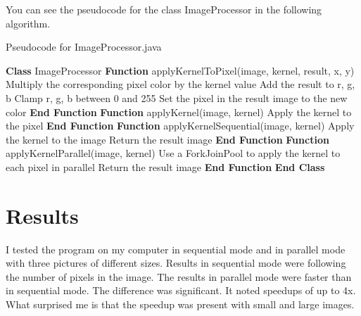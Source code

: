 \documentclass{article}
\begin{document}
\begin{multicols}{2}
    You can see the pseudocode for the class ImageProcessor in the following algorithm.

    \begin{algorithm}[H]
        \caption{Pseudocode for ImageProcessor.java}
        \begin{algorithmic}[1]
            \State \textbf{Class} ImageProcessor
            \State \textbf{Function} applyKernelToPixel(image, kernel, result, x, y)
            \State Multiply the corresponding pixel color by the kernel value
            \State Add the result to r, g, b
            \EndFor
            \State Clamp r, g, b between 0 and 255
            \State Set the pixel in the result image to the new color
            \State \textbf{End Function}
            \State
            \State \textbf{Function} applyKernel(image, kernel)
            \State Apply the kernel to the pixel
            \EndFor
            \State \textbf{End Function}
            \State
            \State \textbf{Function} applyKernelSequential(image, kernel)
            \State Apply the kernel to the image
            \State Return the result image
            \State \textbf{End Function}
            \State
            \State \textbf{Function} applyKernelParallel(image, kernel)
            \State Use a ForkJoinPool to apply the kernel to each pixel in parallel
            \State Return the result image
            \State \textbf{End Function}
            \State \textbf{End Class}
        \end{algorithmic}
    \end{algorithm}


    \section{Results}

    I tested the program on my computer in sequential mode and in parallel mode with three pictures of different sizes. Results in sequential mode were following the number of pixels in the image. The results in parallel mode were faster than in sequential mode. The difference was significant. It noted speedups of up to 4x. What surprised me is that the speedup was present with small and large images.


\end{multicols}
\end{document}
